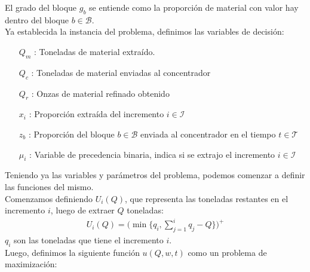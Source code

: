 \documentclass[12pt,letterpaper]{article}
\newcommand\mB{\mathcal{B}}
\newcommand\mI{\mathcal{I}}
\newcommand\mT{\mathcal{T}}
\begin{document}
El grado del bloque $g_b$ se entiende como la proporción de material con valor hay dentro del bloque $b\in\mB$.\\

Ya establecida la instancia del problema, definimos las variables de decisión:

\begin{itemize}
    \item[$Q_m$] : Toneladas de material extraído. 
    \item[$Q_c$] : Toneladas de material enviadas al concentrador
    \item[$Q_r$] : Onzas de material refinado obtenido
    \item[$x_i$] : Proporción extraída del incremento $i\in\mI$
    \item[$z_b$] : Proporción del bloque $b\in\mB$ enviada al concentrador en el tiempo $t\in \mT$
    \item[$\mu_i$] : Variable de precedencia binaria, indica si se extrajo el incremento $i\in\mI$
\end{itemize}

Teniendo ya las variables y parámetros del problema, podemos comenzar a definir las funciones del mismo.\\
Comenzamos definiendo $U_i(Q)$, que representa las toneladas restantes en el incremento $i$, luego de extraer $Q$ toneladas:
\begin{align*}
U_i(Q) = \Big(\min\big\{q_i,\sum\limits_{j=1}^{i} q_j-Q\big\}\Big)^+
\end{align*}
$q_i$ son las toneladas que tiene el incremento $i$.\\
Luego, definimos la siguiente función $u(Q,w,t)$ como un problema de maximización:
\end{document}

